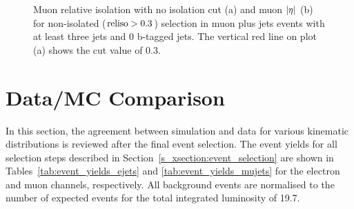 \begin{figure}[!htbp]
	\centering
  	\hfill
    \caption[Muon relative isolation with no isolation cut and muon $\abs \eta$ for non-isolated selection in muon plus
    jets events]{Muon relative isolation with no isolation cut (a) and muon $\abs \eta$ (b) for non-isolated ($\textrm{reliso} >
    0.3$) selection in muon plus jets events with at least three jets and 0 b-tagged jets. The vertical red line on plot
    (a) shows the \reliso cut value of \num{0.3}.}
    \label{fig:qcd_muon_plots}
\end{figure}

\section{Data/MC Comparison}
\label{s_xsection:data_mc_comparison}

In this section, the agreement between simulation and data for various kinematic distributions is reviewed after the
final event selection. The event yields for all selection steps described in Section~\ref{s_xsection:event_selection}
are shown in Tables~\ref{tab:event_yields_ejets} and \ref{tab:event_yields_mujets} for the electron and muon channels,
respectively. All background events are normalised to the number of expected events for the total integrated luminosity
of \SI{19.7}{\fbinv}.

